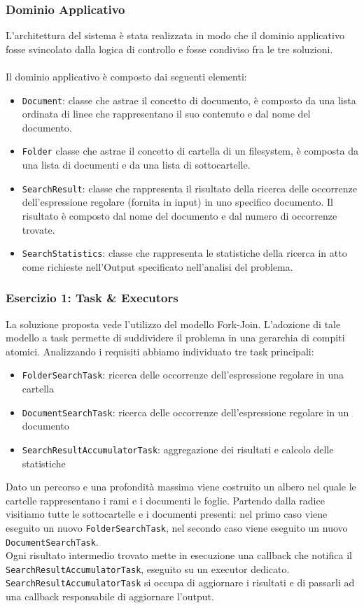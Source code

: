 \documentclass[a4paper]{article}
\begin{document}
\subsubsection{Dominio Applicativo}
L'architettura del sistema è stata realizzata in modo che il dominio applicativo fosse svincolato dalla logica di controllo e fosse condiviso fra le tre soluzioni.\\\\
Il dominio applicativo è composto dai seguenti elementi:
\begin{itemize}
    \item \texttt{Document}: classe che astrae il concetto di documento, è composto da una lista ordinata di linee che rappresentano il suo contenuto e dal nome del documento.
    \item \texttt{Folder} classe che astrae il concetto di cartella di un filesystem, è composta da una lista di documenti e da una lista di sottocartelle.
    \item \texttt{SearchResult}: classe che rappresenta il risultato della ricerca delle occorrenze dell'espressione regolare (fornita in input) in uno specifico documento. Il risultato è composto dal nome del documento e dal numero di occorrenze trovate.
    \item \texttt{SearchStatistics}: classe che rappresenta le statistiche della ricerca in atto come richieste nell'Output specificato nell'analisi del problema. 
\end{itemize}
\subsubsection{Esercizio 1: Task \& Executors}
La soluzione proposta vede l'utilizzo del modello Fork-Join. L'adozione di tale modello a task permette di suddividere il problema in una gerarchia di compiti atomici.
Analizzando i requisiti abbiamo individuato tre task principali:
\begin{itemize}
    \item \texttt{FolderSearchTask}: ricerca delle occorrenze dell'espressione regolare in una cartella
    \item \texttt{DocumentSearchTask}: ricerca delle occorrenze dell'espressione regolare in un documento
    \item \texttt{SearchResultAccumulatorTask}: aggregazione dei risultati e calcolo delle statistiche
\end{itemize}
Dato un percorso e una profondità massima viene costruito un albero nel quale le cartelle rappresentano i rami e i documenti le foglie. Partendo dalla radice visitiamo tutte le sottocartelle e i documenti presenti: nel primo caso viene eseguito un nuovo \texttt{FolderSearchTask}, nel secondo caso viene eseguito un nuovo \texttt{DocumentSearchTask}.\\
Ogni risultato intermedio trovato mette in esecuzione una callback che notifica il \texttt{SearchResultAccumulatorTask}, eseguito su un executor dedicato.\\
\texttt{SearchResultAccumulatorTask} si occupa di aggiornare i risultati e di passarli ad una callback responsabile di aggiornare l'output.  
\end{document}

